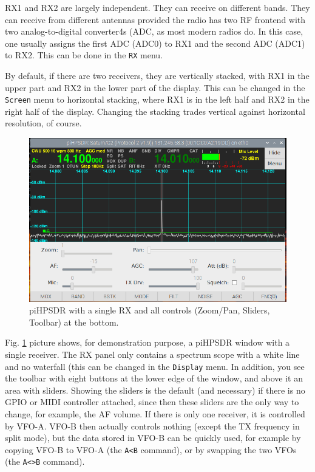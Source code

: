 \documentclass[12pt]{book}
\def\bltt#1{\texttt{\color{blue}#1}}
\begin{document}
 RX1 and RX2 are largely independent. They can receive on different
 bands. They can receive from different antennas provided the radio
 has two RF frontend with two analog-to-digital converter4s (ADC,
 as most modern radios do. In this case, one usually
 assigns the first ADC (ADC0) to RX1 and the second ADC (ADC1) to
 RX2. This can be done in the \bltt{RX} menu.
 
 By default, if there are two receivers, they are vertically stacked,
 with RX1 in the upper part and RX2 in the lower part of the display.
 This can be changed in the \bltt{Screen} menu to horizontal stacking,
 where RX1 is  in the left half and RX2 in the right half of  the 
 display. Changing the stacking trades vertical against horizontal
 resolution, of course.
 
  
\begin{figure}[ht]
\center
\includegraphics[width=12cm]{SingleReceiver.png}
\caption{piHPSDR with a single RX and all controls (Zoom/Pan,
Sliders, Toolbar) at the  bottom.}
\label{fig:SingleReceiver}
\end{figure}

 Fig. \ref{fig:SingleReceiver} picture shows, for demonstration purpose, a piHPSDR
 window with a single receiver. 
 The RX panel only contains a
 spectrum scope with a white line and no waterfall (this can be changed in the
 \bltt{Display} menu. In addition, you see the toolbar
 with eight buttons at the lower edge of the window, and above
 it an area with sliders. Showing the sliders is the default
 (and necessary) if there is no GPIO or MIDI controller attached,
 since then these sliders are the only way to change, for example,
 the AF volume. If there is only one receiver, it is controlled
 by VFO-A. VFO-B then actually controls nothing (except the TX
 frequency in split mode), but the data stored in VFO-B can
 be quickly used, for example by copying VFO-B to VFO-A (the
 \bltt{A<B} command), or by swapping the two VFOs (the \bltt{A<>B} command).
\end{document}
